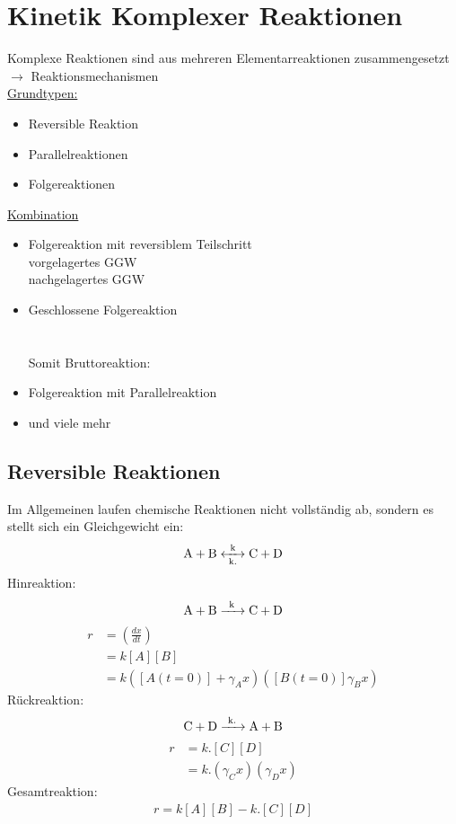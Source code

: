 \documentclass[a4paper, fleqn]{article}
\begin{document}
\section{Kinetik Komplexer Reaktionen}
Komplexe Reaktionen sind aus mehreren Elementarreaktionen zusammengesetzt $\rightarrow$ Reaktionsmechanismen\\
\underline{Grundtypen:}
\begin{itemize}
    \item Reversible Reaktion
    \item Parallelreaktionen
    \item Folgereaktionen
\end{itemize}
\underline{Kombination}
\begin{itemize}
    \item Folgereaktion mit reversiblem Teilschritt\\ vorgelagertes GGW \\nachgelagertes GGW 
    \item Geschlossene Folgereaktion\\\\\\Somit Bruttoreaktion: 
    \item Folgereaktion mit Parallelreaktion
    \item und viele mehr
\end{itemize}
\subsection{Reversible Reaktionen}
Im Allgemeinen laufen chemische Reaktionen nicht vollständig ab, sondern es stellt sich ein Gleichgewicht ein:
\begin{equation*}
    \ce{A + B <->[{k}][{k.}] C + D}
\end{equation*}
Hinreaktion:
\begin{equation*}
    \ce{A + B ->[{k}] C + D}
\end{equation*}
\begin{align*}
    r &= \left(\frac{dx}{dt}\right)\\
    &= k[A][B]\\
    &= k([A(t=0)]+\gamma_Ax)([B(t=0)]\gamma_Bx)
\end{align*}
Rückreaktion:
\begin{equation*}
    \ce{C + D ->[{k.}] A + B}
\end{equation*}
\begin{align*}
    r &= k.[C][D]\\
    &= k.(\gamma_Cx)(\gamma_Dx)
\end{align*}
Gesamtreaktion:
\begin{align*}
    r = k[A][B]-k.[C][D]
\end{align*}
\end{document}
